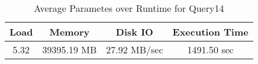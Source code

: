 \documentclass[../../main.tex]{subfiles}
\begin{document}
    \begin{table}
        \begin{center}
            \begin{tabular}{ |c|c|c|c| } 
            \hline
            Load & Memory & Disk IO & Execution Time\\
            \hline
            5.32 & 39395.19 MB & 27.92 MB/sec & 1491.50 sec \\
            \hline
            \end{tabular}
            \\[1pt]
            \caption{Average Parametes over Runtime for Query14}
        \end{center}
    \end{table}
    \pagebreak
\end{document}

